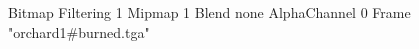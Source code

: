 {Bitmap
	{Filtering 1}
	{Mipmap 1}
	{Blend none}
	{AlphaChannel 0}
	{Frame "orchard1#burned.tga"}
}
